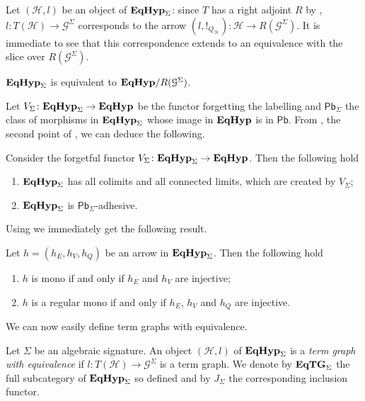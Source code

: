 \documentclass[a4paper,UKenglish,cleveref,pdftex,thm-restate,numberwithinsect]{lipics-v2021}
\newcommand{\pbc}{\mathsf{Pb}}
\newcommand{\catname}[1]{\textbf{\textup{#1}}}
\newcommand{\EqHyp}{\catname{EqHyp}} %
\newcommand{\EqTG}{\catname{EqTG}}
\begin{document}
Let $(\mathcal{H}, l)$ be an object of $\EqHyp_\Sigma$: since $T$ has a right adjoint $R$ by , $l\colon T(\mathcal{H})\to \mathcal{G}^\Sigma$ corresponds to the arrow $(l, !_{Q_{\mathcal{H}}})\colon \mathcal{H}\to R(\mathcal{G}^\Sigma)$. It is immediate to see that this correspondence extends to an equivalence with the slice over $R(\mathcal{G}^\Sigma)$.

\begin{proposition}\label{prop:slice}
$\EqHyp_\Sigma$ is equivalent to $\EqHyp/R(\mathcal{G}^\Sigma)$.
\end{proposition}

Let $V_\Sigma\colon \EqHyp_\Sigma\to \EqHyp$ be the functor forgetting the labelling and $\pbc_\Sigma$ the class of morphisms in $\EqHyp_\Sigma$ whose image in $\EqHyp$ is in $\pbc$. From , the second point of , we can deduce the following.

\begin{proposition}\label{prop:lim}Consider the forgetful functor $V_{\Sigma}\colon \EqHyp_\Sigma\to \EqHyp$. Then the following hold
	\begin{enumerate}
		\item $\EqHyp_\Sigma$ has all colimits and all connected limits, which are created by $V_{\Sigma}$;
		\item $\EqHyp_\Sigma$ is $\pbc_\Sigma$-adhesive.
	\end{enumerate}
\end{proposition}

Using  we immediately get the following result. 

\begin{corollary}\label{prop:monos_in_eqhyps} Let $h=(h_{E}, h_V, h_Q)$ be an arrow in $\EqHyp_\Sigma$. Then the following hold
	\begin{enumerate}
		\item $h$ is mono if and only if $h_E$ and $h_V$ are injective;
		\item $h$ is a regular mono if and only if $h_E$, $h_V$ and $h_Q$ are injective.
	\end{enumerate}
\end{corollary}


We can now easily define term graphs with equivalence.

\begin{definition}Let $\Sigma$ be an algebraic signature.
	An object $(\mathcal{H}, l)$ of $\EqHyp_\Sigma$ is a \emph{term graph with equivalence} if $l\colon T(\mathcal{H})\to \mathcal{G}^\Sigma$ is a term graph. We denote by $\EqTG_{\Sigma}$ the full subcategory of $\EqHyp_\Sigma$ so defined and by $J_{\Sigma}$ the corresponding inclusion functor.
 \end{definition}
\end{document}
